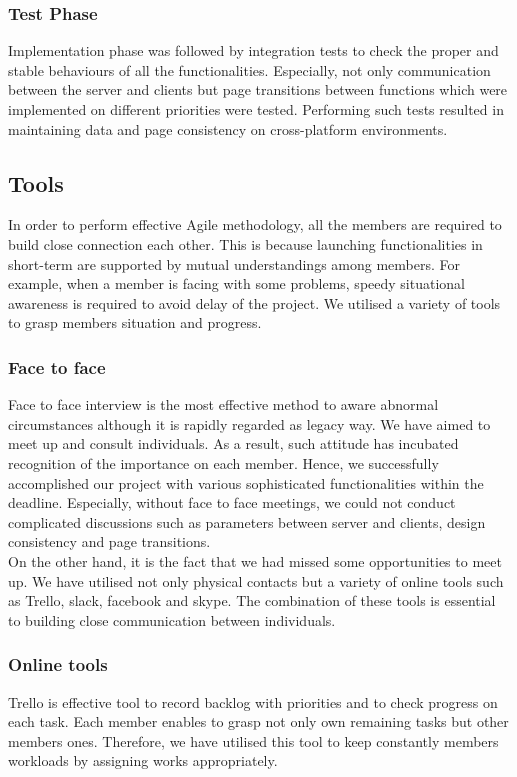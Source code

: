 \documentclass{article}
\begin{document}
\subsubsection{Test Phase}
Implementation phase was followed by integration tests to check the proper and stable behaviours of all the functionalities. Especially, not only communication between the server and clients but page transitions between functions which were implemented on different priorities were tested. Performing such tests resulted in maintaining data and page consistency on cross-platform environments. 

\subsection{Tools}
In order to perform effective Agile methodology, all the members are required to build close connection each other. This is because launching functionalities in short-term are supported by mutual understandings among members. For example, when a member is facing with some problems, speedy situational awareness is required to avoid delay of the project. We utilised a variety of tools to grasp members situation and progress.           
\subsubsection{Face to face}
Face to face interview is the most effective method to aware abnormal circumstances although it is rapidly regarded as legacy way. We have aimed to meet up and consult individuals. As a result, such attitude has incubated recognition of the importance on each member. Hence, we successfully accomplished our project with various sophisticated functionalities within the deadline. Especially, without face to face meetings, we could not conduct complicated discussions such as parameters between server and clients, design consistency and page transitions.\\
On the other hand, it is the fact that we had missed some opportunities to meet up. We have utilised not only physical contacts but a variety of online tools such as Trello, slack, facebook and skype. The combination of these tools is essential to building close communication between individuals.
\subsubsection{Online tools}

Trello \cite{trello} is effective tool to record backlog with priorities and to check progress on each task. Each member enables to grasp not only own remaining tasks but other members ones. Therefore, we have utilised this tool to keep constantly members workloads by assigning works appropriately.\\
\end{document}

